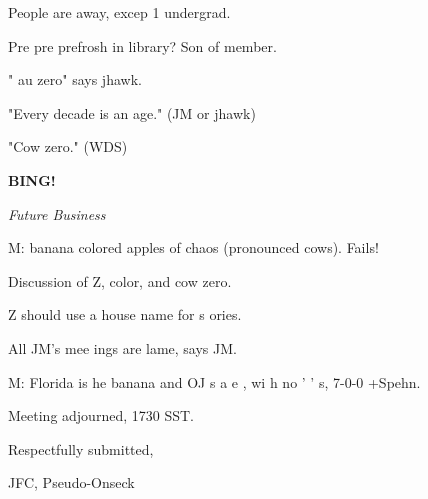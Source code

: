 \documentclass[12pt]{article}
\newcommand{\bing}{{\bf BING!} }
\newcommand{\goto}[1]{\bing \vskip 12pt \centerline{{\em{#1}}}}
\begin{document}
People are away, excep  1 undergrad.

Pre pre prefrosh in library? Son of member.

" au zero" says jhawk.

"Every decade is an age." (JM or jhawk)

"Cow zero." (WDS)

\goto{Future Business}

M: banana colored apples of chaos (pronounced cows). Fails!

Discussion of  Z, color, and cow zero.

 Z should use a house name for s ories.
 
All JM's mee ings are lame, says JM.

M: Florida is  he banana and OJ s a e , wi h no ' ' s, 7-0-0 +Spehn.

\vspace{12pt}

\noindent
Meeting adjourned, 1730 SST.

\vspace{18pt}

\centerline{Respectfully submitted,}
\centerline{JFC, Pseudo-Onseck}
\end{document}
